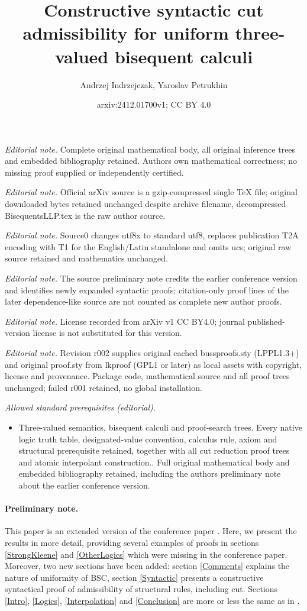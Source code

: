\documentclass[10pt,a4paper]{article}
\title{Constructive syntactic cut admissibility for uniform three-valued bisequent calculi}
\author{Andrzej Indrzejczak, Yaroslav Petrukhin}
\date{arxiv:2412.01700v1; CC BY 4.0}
\theoremstyle{definition}
\newcommand{\3}{\vspace{.3in}}
\newcommand{\2}{\vspace{.2in}}
\newcommand{\1}{\vspace{.1in}}
\newcommand{\5}{\vspace{.05in}}
\begin{document}
\maketitle
\noindent\textit{Editorial note.} Complete original mathematical body, all original inference trees and embedded bibliography retained. Authors own mathematical correctness; no missing proof supplied or independently certified.\par\medskip
\noindent\textit{Editorial note.} Official arXiv source is a gzip-compressed single TeX file; original downloaded bytes retained unchanged despite archive filename, decompressed BisequentsLLP.tex is the raw author source.\par\medskip
\noindent\textit{Editorial note.} Source0 changes utf8x to standard utf8, replaces publication T2A encoding with T1 for the English/Latin standalone and omits ucs; original raw source retained and mathematics unchanged.\par\medskip
\noindent\textit{Editorial note.} The source preliminary note credits the earlier conference version and identifies newly expanded syntactic proofs; citation-only proof lines of the later dependence-like source are not counted as complete new author proofs.\par\medskip
\noindent\textit{Editorial note.} License recorded from arXiv v1 CC BY4.0; journal published-version license is not substituted for this version.\par\medskip
\noindent\textit{Editorial note.} Revision r002 supplies original cached bussproofs.sty (LPPL1.3+) and original proof.sty from lkproof (GPL1 or later) as local assets with copyright, license and provenance. Package code, mathematical source and all proof trees unchanged; failed r001 retained, no global installation.\par\medskip
\noindent\textit{Allowed standard prerequisites (editorial).}\begin{itemize}
\item Three-valued semantics, bisequent calculi and proof-search trees. Every native logic truth table, designated-value convention, calculus rule, axiom and structural prerequisite retained, together with all cut reduction proof trees and atomic interpolant construction.. Full original mathematical body and embedded bibliography retained, including the authors preliminary note about the earlier conference version.
\end{itemize}\medskip
\paragraph{Preliminary note.} This paper is an extended version of the conference paper \cite{IndrzejczakPetrukhinCADE}. Here, we present the results in more detail, providing several examples of proofs in sections \ref{StrongKleene} and \ref{OtherLogics} which were missing in the conference paper. Moreover, two new sections have been added: section \ref{Comments} explains the nature of uniformity of BSC, section \ref{Syntactic} presents a constructive syntactical proof of admissibility of structural rules, including cut. Sections \ref{Intro}, \ref{Logics}, \ref{Interpolation} and \ref{Conclusion} are more or less the same as in \cite{IndrzejczakPetrukhinCADE}.
\end{document}
